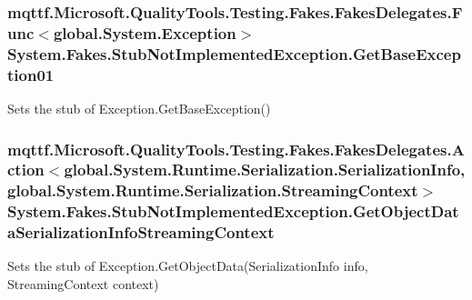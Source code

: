\hypertarget{class_system_1_1_fakes_1_1_stub_not_implemented_exception_a8bf449ee98ad1c463e2fda0ebe816d27}{
\subsubsection[{Get\-Base\-Exception01}]{\setlength{\rightskip}{0pt plus 5cm}mqttf.\-Microsoft.\-Quality\-Tools.\-Testing.\-Fakes.\-Fakes\-Delegates.\-Func$<$global.\-System.\-Exception$>$ System.\-Fakes.\-Stub\-Not\-Implemented\-Exception.\-Get\-Base\-Exception01}}\label{class_system_1_1_fakes_1_1_stub_not_implemented_exception_a8bf449ee98ad1c463e2fda0ebe816d27}


Sets the stub of Exception.\-Get\-Base\-Exception()

\hypertarget{class_system_1_1_fakes_1_1_stub_not_implemented_exception_adfa756a226cb6dc5bce17511fd6b4f2d}{
\subsubsection[{Get\-Object\-Data\-Serialization\-Info\-Streaming\-Context}]{\setlength{\rightskip}{0pt plus 5cm}mqttf.\-Microsoft.\-Quality\-Tools.\-Testing.\-Fakes.\-Fakes\-Delegates.\-Action$<$global.\-System.\-Runtime.\-Serialization.\-Serialization\-Info, global.\-System.\-Runtime.\-Serialization.\-Streaming\-Context$>$ System.\-Fakes.\-Stub\-Not\-Implemented\-Exception.\-Get\-Object\-Data\-Serialization\-Info\-Streaming\-Context}}\label{class_system_1_1_fakes_1_1_stub_not_implemented_exception_adfa756a226cb6dc5bce17511fd6b4f2d}


Sets the stub of Exception.\-Get\-Object\-Data(\-Serialization\-Info info, Streaming\-Context context)

